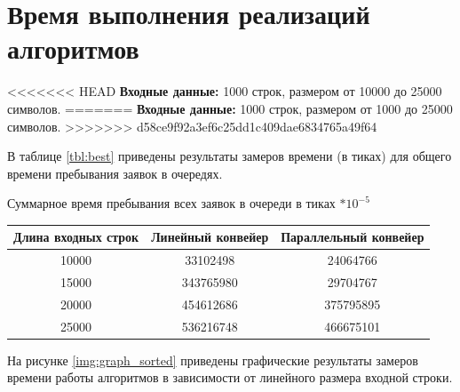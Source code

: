 \section{Время выполнения реализаций алгоритмов}

<<<<<<< HEAD
\textbf{Входные данные:} 1000 строк, размером от 10000 до 25000 символов.
=======
\textbf{Входные данные:} 1000 строк, размером от 1000 до 25000 символов.
>>>>>>> d58ce9f92a3ef6c25dd1c409dae6834765a49f64

В таблице \ref{tbl:best} приведены результаты замеров времени (в тиках) для общего времени пребывания заявок в очередях.

\begin{center}
	\begin{threeparttable}
		\caption{Суммарное время пребывания всех заявок в очереди в тиках $* 10^{-5}$}
		\label{tbl:best}
		\begin{tabular}{|c|c|c|}
			\hline
			Длина входных строк &Линейный конвейер &Параллельный конвейер\\
			\hline
			10000 & 33102498& 24064766 \\
			\hline
		    15000& 343765980 & 29704767 \\
		    \hline
		    20000& 454612686 & 375795895\\
			\hline
		    25000 & 536216748& 466675101 \\
			\hline
		\end{tabular}
		
	\end{threeparttable}
\end{center}


 На рисунке \ref{img:graph_sorted} приведены графические результаты замеров времени работы алгоритмов в зависимости от линейного размера входной строки.

\begin{center}
	\label{img:graph_sorted}
\end{center}






